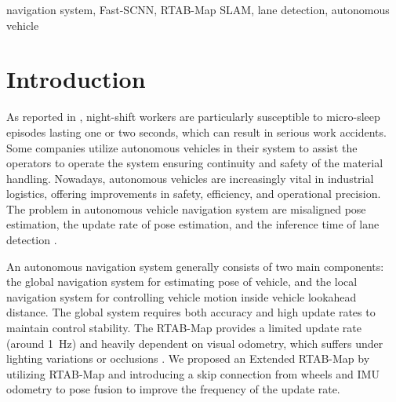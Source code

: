 \documentclass[conference, a4paper]{IEEEtran}[2015/08/26]
\begin{document}
\begin{IEEEkeywords}
	navigation system, Fast-SCNN, RTAB-Map SLAM, lane detection, autonomous vehicle 
\end{IEEEkeywords}


\section{Introduction}

As reported in \cite{ref_sleep}, night-shift workers are particularly susceptible to micro-sleep episodes lasting one or two seconds, which can result in serious work accidents. Some companies utilize autonomous vehicles in their system to assist the operators to operate the system ensuring continuity and safety of the material handling. Nowadays, autonomous vehicles are increasingly vital in industrial logistics, offering improvements in safety, efficiency, and operational precision. The problem in autonomous vehicle navigation system are misaligned pose estimation, the update rate of pose estimation, and the inference time of lane detection \cite{ref_realtime_lane_detection}. 

\par
An autonomous navigation system generally consists of two main components: the global navigation system for estimating pose of vehicle, and the local navigation system for controlling vehicle motion inside vehicle lookahead distance. The global system requires both accuracy and high update rates to maintain control stability. The RTAB-Map provides a limited update rate (around 1~Hz) and heavily dependent on visual odometry, which suffers under lighting variations or occlusions \cite{ref_rtabmap} \cite{ref_vslam}. We proposed an Extended RTAB-Map by utilizing RTAB-Map and introducing a skip connection from wheels and IMU odometry to pose fusion to improve the frequency of the update rate. 
\end{document}
